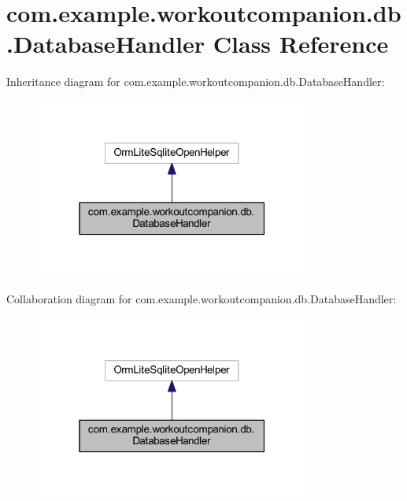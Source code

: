 \hypertarget{classcom_1_1example_1_1workoutcompanion_1_1db_1_1_database_handler}{\section{com.\-example.\-workoutcompanion.\-db.\-Database\-Handler Class Reference}
\label{classcom_1_1example_1_1workoutcompanion_1_1db_1_1_database_handler}
}


Inheritance diagram for com.\-example.\-workoutcompanion.\-db.\-Database\-Handler\-:\nopagebreak
\begin{figure}[H]
\begin{center}
\leavevmode
\includegraphics[width=256pt]{classcom_1_1example_1_1workoutcompanion_1_1db_1_1_database_handler__inherit__graph}
\end{center}
\end{figure}


Collaboration diagram for com.\-example.\-workoutcompanion.\-db.\-Database\-Handler\-:\nopagebreak
\begin{figure}[H]
\begin{center}
\leavevmode
\includegraphics[width=256pt]{classcom_1_1example_1_1workoutcompanion_1_1db_1_1_database_handler__coll__graph}
\end{center}
\end{figure}

